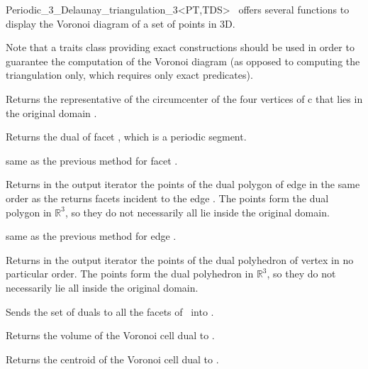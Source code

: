 \begin{ccRefClass}{Periodic_3_Delaunay_triangulation_3<PT,TDS>}
\cgal\ offers several functions to display the Voronoi diagram of 
a set of points in 3D.


Note that a traits class providing exact constructions should be used
in order to guarantee the computation of the Voronoi diagram (as
opposed to computing the triangulation only, which requires only exact
predicates). 


{Returns the representative of the circumcenter of the four vertices
  of c that lies in the original domain .}

{Returns the dual of facet , which is a periodic segment.}

{same as the previous method for facet .
}

{Returns in the output iterator the points of the dual polygon of
  edge  in the same order as the  returns
  facets incident to the edge . The points form the dual polygon
  in $\mathbb R^3$, so they do not necessarily all lie inside the
  original domain.}

{same as the previous method for edge .
}

{Returns in the output iterator the points of the dual polyhedron of
  vertex  in no particular order. The points form the dual
  polyhedron in $\mathbb R^3$, so they do not necessarily lie all
  inside the original domain.}

{Sends the set of duals to all the facets of \ccVar\ into .}

{Returns the volume of the Voronoi cell dual to .}

{Returns the centroid of the Voronoi cell dual to .}


\end{ccRefClass}
